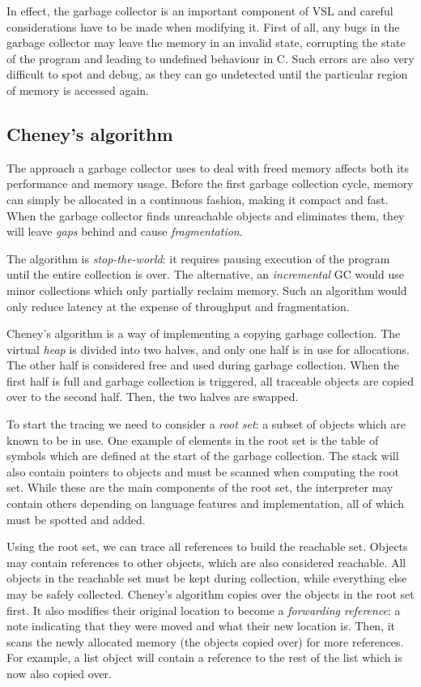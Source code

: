 In effect, the garbage collector is an important component of VSL and careful considerations
have to be made when modifying it. First of all, any bugs in the garbage collector may leave the memory in
an invalid state, corrupting the state of the program and leading to undefined behaviour in C. Such errors
are also very difficult to spot and debug, as they can go undetected until the particular region of memory
is accessed again.

\subsection{Cheney's algorithm}
The approach a garbage collector uses to deal with freed memory affects both its performance and memory usage.
Before the first garbage collection cycle, memory can simply be allocated in a continuous fashion, making it
compact and fast. When the garbage collector finds unreachable objects and eliminates them, they will leave
\emph{gaps} behind and cause \emph{fragmentation}.

The algorithm is \emph{stop-the-world}:
it requires pausing execution of the program until the entire collection is over.
The alternative, an \emph{incremental} GC would use minor collections which only partially reclaim memory.
Such an algorithm would only reduce latency at the expense of throughput and fragmentation.

Cheney's algorithm \cite{cheney} is a way of implementing a copying garbage collection.
The virtual \emph{heap} is divided into
two halves, and only one half is in use for allocations. The other half is considered free and used during garbage
collection. When the first half is full and garbage collection is triggered, all traceable objects are copied over
to the second half. Then, the two halves are swapped.

To start the tracing we need to consider a \emph{root set}: a subset of objects which are known to be in use.
One example of elements in the root set is the table of symbols which are defined at the start
of the garbage collection.
The stack will also contain pointers to objects and must be scanned when computing the root set.
While these are the main components of the root set, the interpreter may contain others depending on language features
and implementation, all of which must be spotted and added.

Using the root set, we can trace all references to build the reachable set. Objects may contain references
to other objects, which are also considered reachable.
All objects in the reachable set must be kept during collection, while everything else may be safely collected.
Cheney's algorithm copies over the objects in the root set first. It also modifies their original location to become
a \emph{forwarding reference}: a note indicating that they were moved and what their new location is. Then, it scans
the newly allocated memory (the objects copied over) for more references.
For example, a list object will contain a reference to the rest of the list which is now also copied over.

